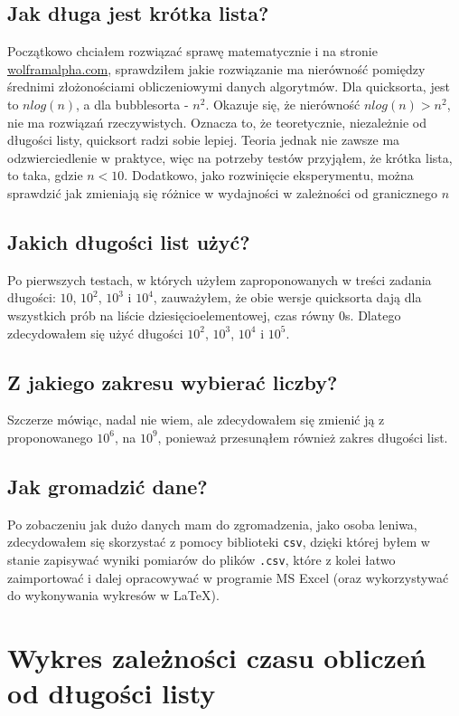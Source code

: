 \documentclass[12pt,a4paper]{article}
\begin{document}
\subsection*{Jak długa jest krótka lista?}
Początkowo chciałem rozwiązać sprawę matematycznie i na stronie \\ \url{wolframalpha.com}, sprawdziłem jakie rozwiązanie ma nierówność pomiędzy średnimi złożonościami obliczeniowymi danych algorytmów. Dla quicksorta, jest to $nlog(n)$, a dla bubblesorta - $n^2$. Okazuje się, że nierówność $nlog(n) > n^2$, nie ma rozwiązań rzeczywistych. Oznacza to, że teoretycznie, niezależnie od długości listy, quicksort radzi sobie lepiej. Teoria jednak nie zawsze ma odzwierciedlenie w praktyce, więc na potrzeby testów przyjąłem, że krótka lista, to taka, gdzie $n < 10$. Dodatkowo, jako rozwinięcie eksperymentu, można sprawdzić jak zmieniają się różnice w wydajności w zależności od granicznego $n$
\subsection*{Jakich długości list użyć?}
Po pierwszych testach, w których użyłem zaproponowanych w treści zadania długości: $10$, $10^2$, $10^3$ i $10^4$, zauważyłem, że obie wersje quicksorta dają dla wszystkich prób na liście dziesięcioelementowej, czas równy 0\si{\second}. Dlatego zdecydowałem się użyć długości $10^2$, $10^3$, $10^4$ i $10^5$.
\subsection*{Z jakiego zakresu wybierać liczby?}
Szczerze mówiąc, nadal nie wiem, ale zdecydowałem się zmienić ją z proponowanego $10^6$, na $10^9$, ponieważ przesunąłem również zakres długości list.
\subsection*{Jak gromadzić dane?}
Po zobaczeniu jak dużo danych mam do zgromadzenia, jako osoba leniwa, zdecydowałem się skorzystać z pomocy biblioteki \verb|csv|, dzięki której byłem w stanie zapisywać wyniki pomiarów do plików \verb|.csv|, które z kolei łatwo zaimportować i dalej opracowywać w programie MS Excel (oraz wykorzystywać do wykonywania wykresów w \LaTeX).
\newpage
\section{Wykres zależności czasu obliczeń od długości listy}
\end{document}
